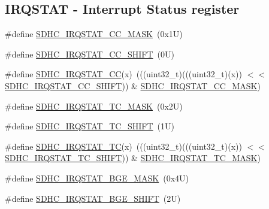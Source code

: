 \subsection*{I\+R\+Q\+S\+T\+AT -\/ Interrupt Status register}
\begin{DoxyCompactItemize}
\item 
\#define \mbox{\hyperlink{group___s_d_h_c___register___masks_ga10719f3e788158bad229768076234b23}{S\+D\+H\+C\+\_\+\+I\+R\+Q\+S\+T\+A\+T\+\_\+\+C\+C\+\_\+\+M\+A\+SK}}~(0x1\+U)
\item 
\#define \mbox{\hyperlink{group___s_d_h_c___register___masks_gab120e3f02ed57b1188dfd2f3b89f324b}{S\+D\+H\+C\+\_\+\+I\+R\+Q\+S\+T\+A\+T\+\_\+\+C\+C\+\_\+\+S\+H\+I\+FT}}~(0\+U)
\item 
\#define \mbox{\hyperlink{group___s_d_h_c___register___masks_ga6aaaea7070cad2656b2b94fd16c02deb}{S\+D\+H\+C\+\_\+\+I\+R\+Q\+S\+T\+A\+T\+\_\+\+CC}}(x)~(((uint32\+\_\+t)(((uint32\+\_\+t)(x)) $<$$<$ \mbox{\hyperlink{group___s_d_h_c___register___masks_gab120e3f02ed57b1188dfd2f3b89f324b}{S\+D\+H\+C\+\_\+\+I\+R\+Q\+S\+T\+A\+T\+\_\+\+C\+C\+\_\+\+S\+H\+I\+FT}})) \& \mbox{\hyperlink{group___s_d_h_c___register___masks_ga10719f3e788158bad229768076234b23}{S\+D\+H\+C\+\_\+\+I\+R\+Q\+S\+T\+A\+T\+\_\+\+C\+C\+\_\+\+M\+A\+SK}})
\item 
\#define \mbox{\hyperlink{group___s_d_h_c___register___masks_ga185e91bcbd3342825308183528069025}{S\+D\+H\+C\+\_\+\+I\+R\+Q\+S\+T\+A\+T\+\_\+\+T\+C\+\_\+\+M\+A\+SK}}~(0x2\+U)
\item 
\#define \mbox{\hyperlink{group___s_d_h_c___register___masks_ga8df344ad864bb882b5c98bdd0cb7899e}{S\+D\+H\+C\+\_\+\+I\+R\+Q\+S\+T\+A\+T\+\_\+\+T\+C\+\_\+\+S\+H\+I\+FT}}~(1\+U)
\item 
\#define \mbox{\hyperlink{group___s_d_h_c___register___masks_gaeb3ba6055b3e5ea836a3742f640db96f}{S\+D\+H\+C\+\_\+\+I\+R\+Q\+S\+T\+A\+T\+\_\+\+TC}}(x)~(((uint32\+\_\+t)(((uint32\+\_\+t)(x)) $<$$<$ \mbox{\hyperlink{group___s_d_h_c___register___masks_ga8df344ad864bb882b5c98bdd0cb7899e}{S\+D\+H\+C\+\_\+\+I\+R\+Q\+S\+T\+A\+T\+\_\+\+T\+C\+\_\+\+S\+H\+I\+FT}})) \& \mbox{\hyperlink{group___s_d_h_c___register___masks_ga185e91bcbd3342825308183528069025}{S\+D\+H\+C\+\_\+\+I\+R\+Q\+S\+T\+A\+T\+\_\+\+T\+C\+\_\+\+M\+A\+SK}})
\item 
\#define \mbox{\hyperlink{group___s_d_h_c___register___masks_gabe62f8072b3ceb7a49288ba5976418d0}{S\+D\+H\+C\+\_\+\+I\+R\+Q\+S\+T\+A\+T\+\_\+\+B\+G\+E\+\_\+\+M\+A\+SK}}~(0x4\+U)
\item 
\#define \mbox{\hyperlink{group___s_d_h_c___register___masks_ga75e2ea9856a63d888c9416ad4c2778dc}{S\+D\+H\+C\+\_\+\+I\+R\+Q\+S\+T\+A\+T\+\_\+\+B\+G\+E\+\_\+\+S\+H\+I\+FT}}~(2\+U)

\end{DoxyCompactItemize}
